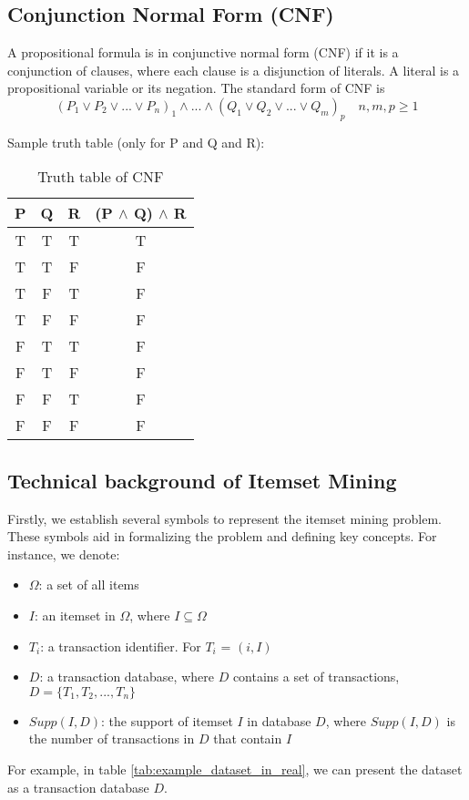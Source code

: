\subsection{Conjunction Normal Form (CNF)}

A propositional formula is in conjunctive normal form (CNF) if it is a conjunction of clauses, where each clause is a disjunction of literals. A literal is a propositional variable or its negation.
The standard form of CNF is
\begin{equation*}
    (P_1 \lor P_2 \lor ... \lor P_n)_1 \land ... \land (Q_1 \lor Q_2 \lor ... \lor Q_m)_p \quad n,m,p \geq 1
\end{equation*}

Sample truth table (only for P and Q and R):
\begin{table}[H]
    \centering
    \caption{Truth table of CNF}
    \label{tab:truth_table_cnf}
    \begin{tabular}{|c|c|c|c|}
        \hline
        P & Q & R & (P $\land$ Q) $\land$ R \\
        \hline
        T & T & T & T                       \\
        T & T & F & F                       \\
        T & F & T & F                       \\
        T & F & F & F                       \\
        F & T & T & F                       \\
        F & T & F & F                       \\
        F & F & T & F                       \\
        F & F & F & F                       \\
        \hline
    \end{tabular}
\end{table}

\subsection{Technical background of Itemset Mining}
Firstly, we establish several symbols to represent the itemset mining problem.
These symbols aid in formalizing the problem and defining key concepts.
For instance, we denote:
\begin{itemize}
    \item \textbf{$\Omega$}: a set of all items
    \item \textbf{$I$}: an itemset in $\Omega$, where $I \subseteq \Omega$
    \item \textbf{$T_i$}: a transaction identifier. For $T_i$ = $(i,I)$
    \item \textbf{$D$}: a transaction database, where $D$ contains a set of transactions, $D = \{T_1, T_2, ..., T_n\}$
    \item \textbf{$Supp(I, D)$}: the support of itemset $I$ in database $D$, where $Supp(I, D)$ is the number of transactions in $D$ that contain $I$
\end{itemize}
For example, in table \ref{tab:example_dataset_in_real},
we can present the dataset as a transaction database $D$.

